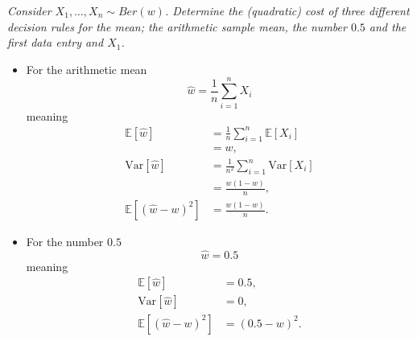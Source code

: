 \begin{example}
	\emph{Consider $X_1,\dots, X_n\sim Ber(w)$. Determine the (quadratic) cost of three different decision rules for the mean; the arithmetic sample mean, the number $0.5$ and the first data entry and $X_1$.}\newline
	
	\begin{itemize}
		\item For the arithmetic mean
		\begin{equation}
			\hat{w}=\frac{1}{n}\sum_{i=1}^nX_i
		\end{equation}
		meaning
		\begin{equation}
			\begin{split}
				\mathbb{E}[\hat{w}] & = \frac{1}{n}\sum_{i=1}^n\mathbb{E}[X_i]\\
				&=w,\\
				\text{Var}[\hat{w}]	&= \frac{1}{n^2}\sum_{i=1}^n\text{Var}[X_i]\\
				& = \frac{w(1-w)}{n},\\
				\mathbb{E}[(\hat{w}-w)^2]&=\frac{w(1-w)}{n}.
			\end{split} 
		\end{equation}

		\item For the number $0.5$ 
		\begin{equation}
			\hat{w}=0.5
		\end{equation}
		meaning
		\begin{equation}
			\begin{split}
				\mathbb{E}[\hat{w}] & = 0.5,\\
				\text{Var}[\hat{w}]	&= 0,\\
				\mathbb{E}[(\hat{w}-w)^2]&=(0.5-w)^2.
			\end{split} 
		\end{equation}
		

\end{itemize}
\end{example}
